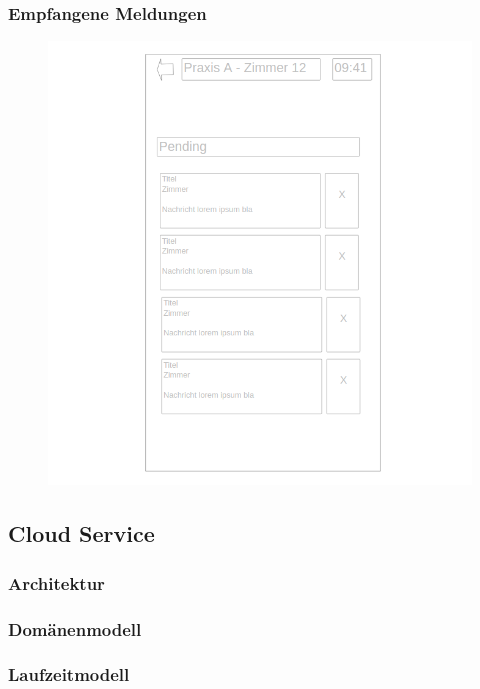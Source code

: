         \subsubsection*{Empfangene Meldungen}
            \begin{figure}
            \centering
            \includegraphics[width=\linewidth]{graphics/mockup-received}\label{fig:inbox-mock}
            \end{figure}


\clearpage
\subsection{Cloud Service}\label{subsec:cloud-service}

\subsubsection{Architektur}
    \subsubsection{Domänenmodell}
    \subsubsection{Laufzeitmodell}

